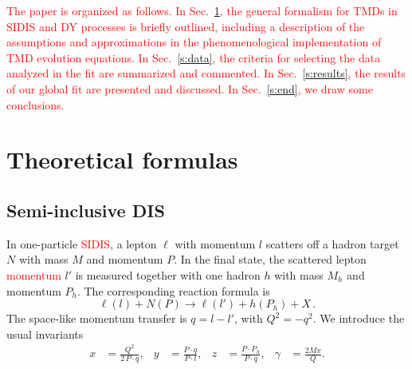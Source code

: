 \documentclass[aps,preprintnumbers,showpacs,nofootinbib,superscriptaddress,floatfix]{revtex4}
\begin{document}
\textcolor{red}{The paper is organized as follows. In Sec.~\ref{s:theory}, the general formalism for TMDs in SIDIS and DY processes is briefly outlined, including a description of the assumptions and approximations in the phenomenological implementation of TMD evolution equations. In Sec.~\ref{s:data}, the criteria for selecting the data analyzed in the fit are summarized and commented. In Sec.~\ref{s:results}, the results of our global fit are presented and discussed. In Sec.~\ref{s:end}, we draw some conclusions. }
   

\section{Theoretical formulas}
\label{s:theory}

\subsection{Semi-inclusive DIS}
\label{ss:SIDIS_formalism}

In one-particle \textcolor{red}{SIDIS}, a lepton $\ell$ with momentum $l$ scatters 
off a hadron target $N$ with mass $M$ and momentum
$P$. In the final state, the scattered lepton \textcolor{red}{momentum} $l'$ is measured together with
one hadron $h$ with mass $M_h$
and momentum $P_h$. The corresponding reaction formula is  
\begin{equation}
  \label{e:sidis}
\ell(l) + N(P) \to \ell(l') + h(P_h) + X \, .
\end{equation}
The space-like momentum transfer is $q = l - l'$, with $Q^2 = - q^2$. We
introduce the usual invariants  
\begin{align}
  \label{e:xyz}
x &= \frac{Q^2}{2\,P\cdot q},
&
y &= \frac{P \cdot q}{P \cdot l},
&
z &= \frac{P \cdot P_h}{P\cdot q},
&
\gamma &= \frac{2 M x}{Q} .
\end{align}
\end{document}

